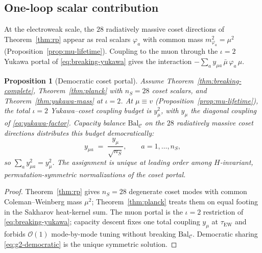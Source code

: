 \documentclass[aps,prd,onecolumn,amsmath,amssymb,nofootinbib,11pt]{revtex4-2}
\numberwithin{equation}{section}
\theoremstyle{plain}
\newtheorem{proposition}[theorem]{Proposition}
\theoremstyle{definition}
\theoremstyle{remark}
\begin{document}
\subsection{One-loop scalar contribution}
\label{sec:g2:oneloop}

At the electroweak scale, the $28$ radiatively massive coset directions of
Theorem~\ref{thm:rp} appear as real scalars $\varphi_a$ with common mass
$m_{\varphi_a}^2=\mu^2$ (Proposition~\ref{prop:mu-lifetime}). Coupling to the
muon through the $\iota=2$ Yukawa portal of \eqref{eq:breaking-yukawa} gives
the interaction $-\sum_a y_{\mu a}\,\bar\mu\,\varphi_a\,\mu$.

\begin{proposition}[Democratic coset portal]\label{prop:g2-democratic}
Assume Theorem~\ref{thm:breaking-complete}, Theorem~\ref{thm:planck} with
$n_S=28$ coset scalars, and Theorem~\ref{thm:yukawa-mass} at $\iota=2$.
At $\mu\equiv v$ (Proposition~\ref{prop:mu-lifetime}), the total
$\iota=2$ Yukawa--coset coupling budget is $y_\mu^2$, with $y_\mu$ the
diagonal coupling of \eqref{eq:yukawa-factor}. Capacity balance
$\mathrm{Bal}_{\mathcal{C}}$ on the $28$ radiatively massive coset directions
distributes this budget democratically:
\begin{equation}\label{eq:g2-democratic}
  y_{\mu a}
  \;=\;
  \frac{y_\mu}{\sqrt{n_S}},
  \qquad
  a=1,\ldots,n_S,
\end{equation}
so $\sum_a y_{\mu a}^2=y_\mu^2$. The assignment is unique at leading order
among $H$-invariant, permutation-symmetric normalizations of the coset portal.
\end{proposition}

\begin{proof}
Theorem~\ref{thm:rp} gives $n_S=28$ degenerate coset modes with common
Coleman--Weinberg mass $\mu^2$; Theorem~\ref{thm:planck} treats them on equal
footing in the Sakharov heat-kernel sum. The muon portal is the
$\iota=2$ restriction of \eqref{eq:breaking-yukawa}; capacity descent fixes
one total coupling $y_\mu$ at $\tau_{\mathrm{EW}}$ and forbids
$\mathcal{O}(1)$ mode-by-mode tuning without breaking
$\mathrm{Bal}_{\mathcal{C}}$. Democratic sharing
\eqref{eq:g2-democratic} is the unique symmetric solution.
\end{proof}
\end{document}
